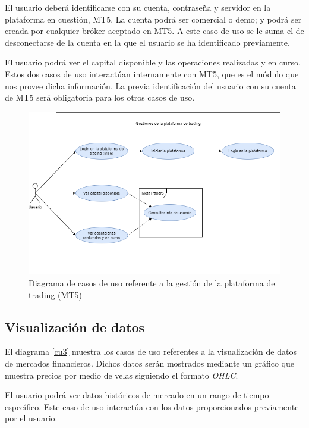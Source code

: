 El usuario deberá identificarse con su cuenta, contraseña y servidor en la plataforma en cuestión, MT5. La cuenta podrá ser comercial o demo; y podrá ser creada por cualquier bróker aceptado en MT5. A este caso de uso se le suma el de desconectarse de la cuenta en la que el usuario se ha identificado previamente. \newline

El usuario podrá ver el capital disponible y las operaciones realizadas y en curso. Estos dos casos de uso interactúan internamente con MT5, que es el módulo que nos provee dicha información. La previa identificación del usuario con su cuenta de MT5 será obligatoria para los otros casos de uso.


\begin{figure}[h] 
	\includegraphics[width=1\textwidth]{imagenes/diagramas_casos_de_uso/CU2-gestiones_MT5.png} 
	\caption{Diagrama de casos de uso referente a la gestión de la plataforma de trading (MT5)}  \label{cu2}
\end{figure}

\subsection{Visualización de datos}

El diagrama \ref{cu3} muestra los casos de uso referentes a la visualización de datos de mercados financieros. Dichos datos serán mostrados mediante un gráfico que muestra precios por medio de velas siguiendo el formato \textit{OHLC}. \newline

El usuario podrá ver datos históricos de mercado en un rango de tiempo específico. Este caso de uso interactúa con los datos proporcionados previamente por el usuario. \newline

